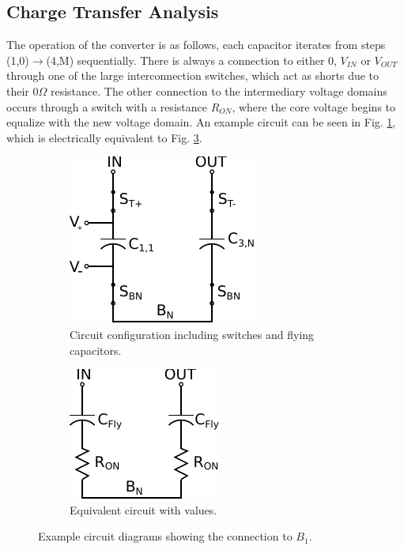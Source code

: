 \documentclass[conference]{article}
\begin{document}
	\subsection{Charge Transfer Analysis}
	The operation of the converter is as follows, each capacitor iterates from steps (1,0)$\rightarrow$(4,M) sequentially. There is always a connection to either 0, $V_{IN}$ or $V_{OUT}$ through one of the large interconnection switches, which act as shorts due to their 0$\Omega$ resistance. The other connection to the intermediary voltage domains occurs through a switch with a resistance $R_{ON}$, where the core voltage begins to equalize with the new voltage domain. An example circuit can be seen in Fig. \ref{fig:step_Circ1}, which is electrically equivalent to Fig. \ref{fig:step_Circ2}. 
	
	\begin{figure}
		\centering
		\begin{subfigure}{0.4\textwidth}
			\centering
			\includegraphics{Figures/step2_Circ.pdf}
			\caption{Circuit configuration including switches and flying capacitors.}
			\label{fig:step_Circ1}
		\end{subfigure}
		\begin{subfigure}{0.4\textwidth}
			\centering
			\includegraphics{Figures/step2_Eq.pdf}
			\caption{Equivalent circuit with values.}
			\label{fig:step_Circ2}	
	\end{subfigure}
		\caption{Example circuit diagrams showing the connection to $B_1$.}
	\end{figure}
\end{document}
